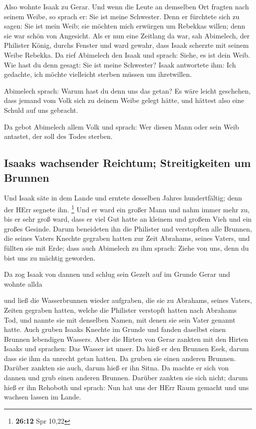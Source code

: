  Also wohnte Isaak zu Gerar.  Und wenn die
Leute an demselben Ort fragten nach seinem Weibe, so sprach er: Sie ist
meine Schwester. Denn er fürchtete sich zu sagen: Sie ist mein Weib; sie
möchten mich erwürgen um Rebekkas willen; denn sie war schön von
Angesicht.  Als er nun eine Zeitlang da war, sah
Abimelech, der Philister König, durchs Fenster und ward gewahr, dass
Isaak scherzte mit seinem Weibe Rebekka.  Da rief
Abimelech den Isaak und sprach: Siehe, es ist dein Weib. Wie hast du
denn gesagt: Sie ist meine Schwester? Isaak antwortete ihm: Ich
gedachte, ich möchte vielleicht sterben müssen um ihretwillen.

 Abimelech sprach: Warum hast du denn uns das getan? Es
wäre leicht geschehen, dass jemand vom Volk sich zu deinem Weibe gelegt
hätte, und hättest also eine Schuld auf uns gebracht.

 Da gebot Abimelech allem Volk und sprach: Wer diesen
Mann oder sein Weib antastet, der soll des Todes sterben.

\hypertarget{isaaks-wachsender-reichtum-streitigkeiten-um-brunnen}{%
\subsection{Isaaks wachsender Reichtum; Streitigkeiten um
Brunnen}\label{isaaks-wachsender-reichtum-streitigkeiten-um-brunnen}}

 Und Isaak säte in dem Lande und erntete desselben Jahres
hundertfältig; denn der HErr segnete ihn. \footnote{\textbf{26:12} Spr
  10,22}  Und er ward ein großer Mann und nahm immer mehr
zu, bis er sehr groß ward,  dass er viel Gut hatte an
kleinem und großem Vieh und ein großes Gesinde. Darum beneideten ihn die
Philister  und verstopften alle Brunnen, die seines
Vaters Knechte gegraben hatten zur Zeit Abrahams, seines Vaters, und
füllten sie mit Erde;  dass auch Abimelech zu ihm sprach:
Ziehe von uns, denn du bist uns zu mächtig geworden.

 Da zog Isaak von dannen und schlug sein Gezelt auf im
Grunde Gerar und wohnte allda

 und ließ die Wasserbrunnen wieder aufgraben, die sie zu
Abrahams, seines Vaters, Zeiten gegraben hatten, welche die Philister
verstopft hatten nach Abrahams Tod, und nannte sie mit denselben Namen,
mit denen sie sein Vater genannt hatte.  Auch gruben
Isaaks Knechte im Grunde und fanden daselbst einen Brunnen lebendigen
Wassers.  Aber die Hirten von Gerar zankten mit den
Hirten Isaaks und sprachen: Das Wasser ist unser. Da hieß er den Brunnen
Esek, darum dass sie ihm da unrecht getan hatten.  Da
gruben sie einen anderen Brunnen. Darüber zankten sie auch, darum hieß
er ihn Sitna.  Da machte er sich von dannen und grub
einen anderen Brunnen. Darüber zankten sie sich nicht; darum hieß er ihn
Rehoboth und sprach: Nun hat uns der HErr Raum gemacht und uns wachsen
lassen im Lande.

